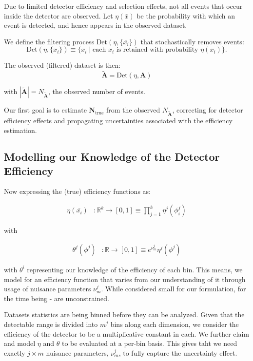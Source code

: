 \documentclass{article}
\newcommand{\dataset}[1]{{\mathbf{#1}}}         %
\newcommand{\true}[1]{{\dataset{#1}}_{\text{true}}}  %
\newcommand{\meas}[1]{{\dataset{\tilde{#1}}}}   %
\newcommand{\detector}{\mathrm{Det}}            %
\begin{document}
Due to limited detector efficiency and selection effects, not all events that occur inside the detector are observed. Let $\eta(\bar{x})$ be the probability with which an event is detected, and hence appears in the observed dataset.

We define the filtering process \(\detector(\eta, \{\bar{x_i}\})\) that stochastically removes events:
\[
\detector(\eta, \{\bar{x_i}\}) \equiv \{ \bar{x_i} \mid \text{each } \bar{x_i} \text{ is retained with probability } \eta(\bar{x_i}) \}.
\]

The observed (filtered) dataset is then:
\[
\meas{A} = \detector(\eta, \dataset{A})
\]

with $|\meas{A}| = N_\meas{A}$, the observed number of events.

Our first goal is to estimate \( \true{N} \) from the observed \( N_\meas{A} \), correcting for detector efficiency effects and propagating uncertainties associated with the efficiency estimation.

\subsection{Modelling our Knowledge of the Detector Efficiency}

Now expressing the (true) efficiency functions as:

\begin{align*}
    \eta(\bar{x_i}) &: \mathbb{R}^k \to [0,1] \equiv \prod_{j=1}^k \eta^j(\phi_i^j)
\end{align*}

with

\begin{align} \label{eq:efficiency_j_explicit_form}
    \theta^j(\phi^j) &: \mathbb{R} \to [0,1] \equiv e^{\nu^j_m}\eta^j(\phi^j)
\end{align}

with $\theta^i$ representing our knowledge of the efficiency of each bin. This means, we model for an efficiency function that varies from our understanding of it through usage of nuisance parameters $\nu^j_m$. While considered small for our formulation, for the time being - are unconstrained.

Datasets statistics are being binned before they can be analyzed. Given that the detectable range is divided into $m^j$ bins along each dimension, we consider the efficiency of the detector to be a multiplicative constant in each. We further claim and model $\eta$ and $\theta$ to be evaluated at a per-bin basis. This gives taht we need exactly $j \times m$ nuisance parameters, $\nu^j_m$, to fully capture the uncertainty effect.
\end{document}
